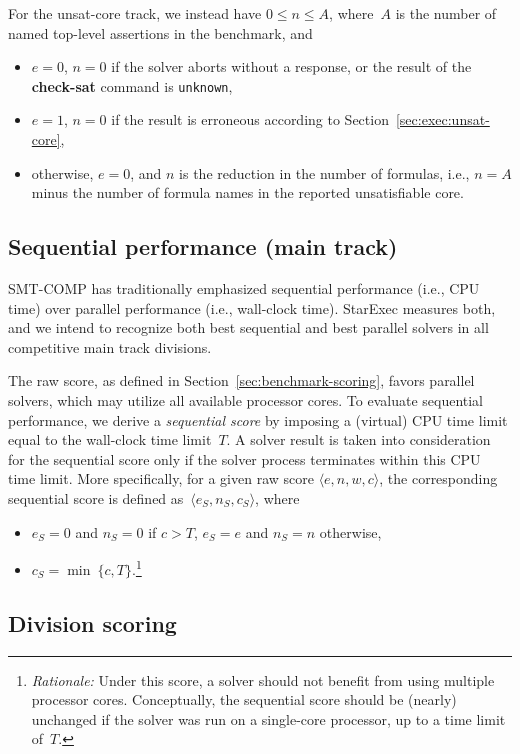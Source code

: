 \documentclass[12pt]{article}
\newcommand{\akey}[1]{\textbf{#1}}
\begin{document}
%
For the unsat-core track, we instead have $0 \leq n \leq A$, where~$A$
is the number of named top-level assertions in the benchmark, and
\begin{itemize}
\item $e=0$, $n=0$ if the solver aborts without a response, or the
  result of the \akey{check-sat} command is \texttt{unknown},
\item $e=1$, $n=0$ if the result is erroneous according to
  Section~\ref{sec:exec:unsat-core},
\item otherwise, $e=0$, and $n$ is the reduction in the number of
  formulas, i.e., $n = A$ minus the number of formula names in the
  reported unsatisfiable core.
\end{itemize}

\subsection{Sequential performance (main track)}
\label{sec:sequential}

SMT-COMP has traditionally emphasized sequential performance (i.e.,
CPU time) over parallel performance (i.e., wall-clock time).  StarExec
measures both, and we intend to recognize both best sequential and
best parallel solvers in all competitive main track divisions.

The raw score, as defined in Section~\ref{sec:benchmark-scoring},
favors parallel solvers, which may utilize all available processor
cores.  To evaluate sequential performance, we derive a
\emph{sequential score} by imposing a (virtual) CPU time limit equal
to the wall-clock time limit~$T$.  A solver result is taken into
consideration for the sequential score only if the solver process
terminates within this CPU time limit.  More specifically, for a given
raw score $\langle e, n, w, c\rangle$, the corresponding sequential
score is defined as~$\langle e_S, n_S, c_S\rangle$, where
\begin{itemize}
\item $e_S = 0$ and $n_S = 0$ if $c > T$, $e_S = e$ and $n_S = n$
  otherwise,
\item $c_S = \min\ \{c, T\}$.\footnote{\emph{Rationale:} Under this
  score, a solver should not benefit from using multiple processor
  cores.  Conceptually, the sequential score should be (nearly)
  unchanged if the solver was run on a single-core processor, up to a
  time limit of~$T$.}
\end{itemize}

\subsection{Division scoring}
\label{sec:division-scoring}
\end{document}
